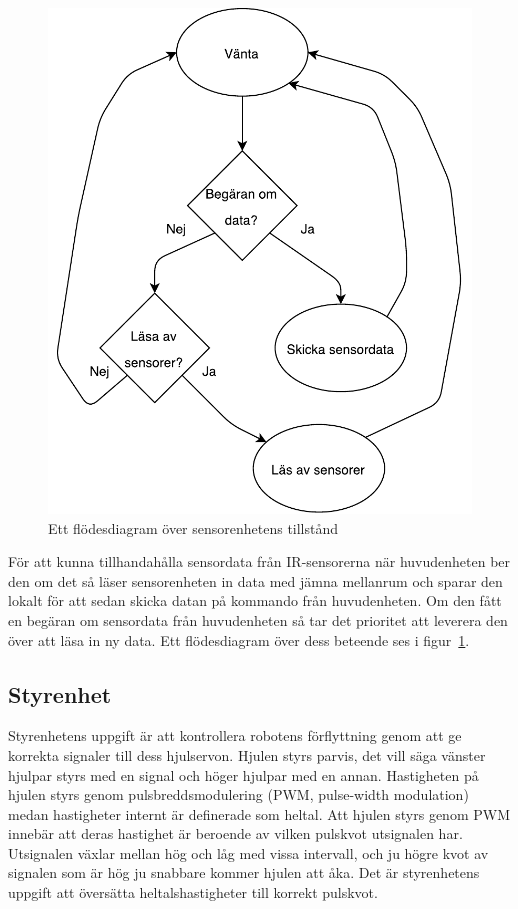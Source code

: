 \documentclass{article}
\begin{document}
\begin{figure}[H]
\centering
\includegraphics[scale=0.6]{sensorenhet_flowchart}
\caption{Ett flödesdiagram över sensorenhetens tillstånd}
\label{fig:sensorenhet_flowchart}
\end{figure}

För att kunna tillhandahålla sensordata från IR-sensorerna när huvudenheten ber den om det så läser sensorenheten in data med jämna mellanrum och sparar den lokalt för att sedan skicka datan på kommando från huvudenheten. Om den fått en begäran om sensordata från huvudenheten så tar det prioritet att leverera den över att läsa in ny data. Ett flödesdiagram över dess beteende ses i figur~\ref{fig:sensorenhet_flowchart}.

\subsection{Styrenhet}
Styrenhetens uppgift är att kontrollera robotens förflyttning genom att ge korrekta signaler till dess hjulservon. Hjulen styrs parvis, det vill säga vänster hjulpar styrs med en signal och höger hjulpar med en annan. Hastigheten på hjulen styrs genom pulsbreddsmodulering (PWM, pulse-width modulation) medan hastigheter internt är definerade som heltal. Att hjulen styrs genom PWM innebär att deras hastighet är beroende av vilken pulskvot utsignalen har. Utsignalen växlar mellan hög och låg med vissa intervall, och ju högre kvot av signalen som är hög ju snabbare kommer hjulen att åka. Det är styrenhetens uppgift att översätta heltalshastigheter till korrekt pulskvot.
\end{document}

